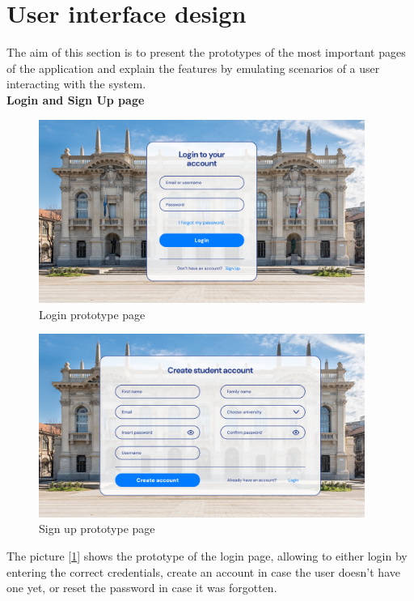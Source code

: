 \documentclass[11pt,twoside]{article}
\begin{document}
\section{User interface design}
The aim of this section is to present the prototypes of the most important pages of the application and explain the features by emulating scenarios of a user interacting with the system.
\vspace{1\baselineskip} \\
\large{\textbf{Login and Sign Up page}}\\
\begin{figure}[H]
\centering
\includegraphics[width=0.95\textwidth]{Images/Login}
\caption{Login prototype page}\label{Login}
\end{figure}
\begin{figure}[H]
\centering
\includegraphics[width=0.95\textwidth]{Images/Sign Up}
\caption{Sign up prototype page}\label{Sign Up}
\end{figure}
The picture [\ref{Login}] shows the prototype of the login page, allowing to either login by entering the correct credentials, create an account in case the user doesn't have one yet, or reset the password in case it was forgotten.\\
\end{document}
